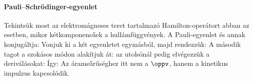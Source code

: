    \paragraph{Pauli--Schrödinger-egyenlet}
    
    Tekintsük most az elektromágneses teret tartalmazó Ha\-mil\-ton-o\-pe\-rá\-tort  abban az esetben, mikor kétkomponensűek a hullámfüggvények.
   A Pauli-egyenlet és annak konjugáltja:
    Vonjuk ki a két egyenletet egymásból, majd rendezzük:
    A második tagot a szokásos módon alakítjuk át:
    \eq{
     \Psi^\dagger\Delta\Psi-\Delta\Psi^\dagger\Psi=\divo{\big(\Psi^\dagger\grad\Psi-\grad\Psi^\dagger\Psi\big)},
    } 
    az utolsónál pedig elvégezzük a deriválásokat:
    Így:
    Az áramsűrűséghez itt nem a $\oppv$, hanem a kinetikus impulzus kapcsolódik.

